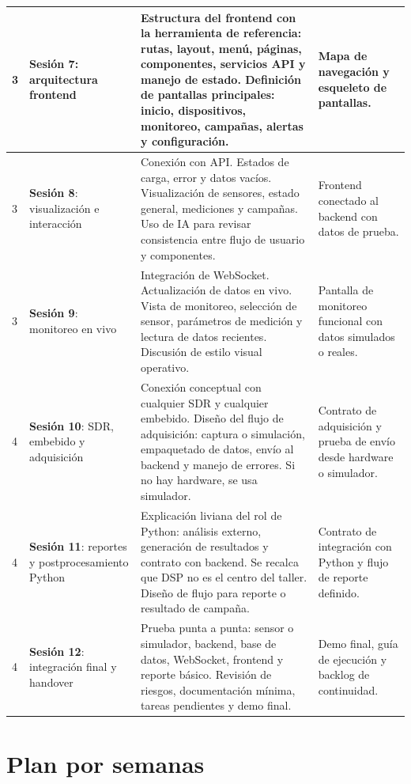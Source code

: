 \documentclass[11pt,a4paper]{article}
\newcommand{\sesion}[1]{\textbf{Sesión #1}}
\begin{document}
\begin{longtable}{|p{}|p{}|p{}|p{}|}
3 & \sesion{7}: arquitectura frontend &
Estructura del frontend con la herramienta de referencia: rutas, layout, menú, páginas, componentes, servicios API y manejo de estado. Definición de pantallas principales: inicio, dispositivos, monitoreo, campañas, alertas y configuración. &
Mapa de navegación y esqueleto de pantallas. \\
\hline

3 & \sesion{8}: visualización e interacción &
Conexión con API. Estados de carga, error y datos vacíos. Visualización de sensores, estado general, mediciones y campañas. Uso de IA para revisar consistencia entre flujo de usuario y componentes. &
Frontend conectado al backend con datos de prueba. \\
\hline

3 & \sesion{9}: monitoreo en vivo &
Integración de WebSocket. Actualización de datos en vivo. Vista de monitoreo, selección de sensor, parámetros de medición y lectura de datos recientes. Discusión de estilo visual operativo. &
Pantalla de monitoreo funcional con datos simulados o reales. \\
\hline

4 & \sesion{10}: SDR, embebido y adquisición &
Conexión conceptual con cualquier SDR y cualquier embebido. Diseño del flujo de adquisición: captura o simulación, empaquetado de datos, envío al backend y manejo de errores. Si no hay hardware, se usa simulador. &
Contrato de adquisición y prueba de envío desde hardware o simulador. \\
\hline

4 & \sesion{11}: reportes y postprocesamiento Python &
Explicación liviana del rol de Python: análisis externo, generación de resultados y contrato con backend. Se recalca que DSP no es el centro del taller. Diseño de flujo para reporte o resultado de campaña. &
Contrato de integración con Python y flujo de reporte definido. \\
\hline

4 & \sesion{12}: integración final y handover &
Prueba punta a punta: sensor o simulador, backend, base de datos, WebSocket, frontend y reporte básico. Revisión de riesgos, documentación mínima, tareas pendientes y demo final. &
Demo final, guía de ejecución y backlog de continuidad. \\
\hline
\end{longtable}

\section*{Plan por semanas}
\end{document}
